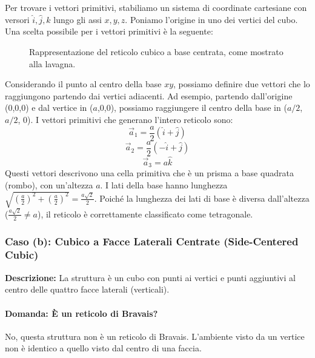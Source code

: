 Per trovare i vettori primitivi, stabiliamo un sistema di coordinate cartesiane con versori $\hat{i}, \hat{j}, \hat{k}$ lungo gli assi $x, y, z$. Poniamo l'origine in uno dei vertici del cubo. Una scelta possibile per i vettori primitivi è la seguente:

\begin{figure}[h!]
    \centering
    \caption{Rappresentazione del reticolo cubico a base centrata, come mostrato alla lavagna.}
\end{figure}

Considerando il punto al centro della base $xy$, possiamo definire due vettori che lo raggiungono partendo dai vertici adiacenti. Ad esempio, partendo dall'origine (0,0,0) e dal vertice in ($a$,0,0), possiamo raggiungere il centro della base in ($a/2$, $a/2$, 0). I vettori primitivi che generano l'intero reticolo sono:
$$ \vec{a}_1 = \frac{a}{2}(\hat{i} + \hat{j}) $$
$$ \vec{a}_2 = \frac{a}{2}(-\hat{i} + \hat{j}) $$
$$ \vec{a}_3 = a\hat{k} $$
Questi vettori descrivono una cella primitiva che è un prisma a base quadrata (rombo), con un'altezza $a$. I lati della base hanno lunghezza $\sqrt{(\frac{a}{2})^2 + (\frac{a}{2})^2} = \frac{a\sqrt{2}}{2}$. Poiché la lunghezza dei lati di base è diversa dall'altezza ($ \frac{a\sqrt{2}}{2} \neq a $), il reticolo è correttamente classificato come tetragonale.

\subsubsection{Caso (b): Cubico a Facce Laterali Centrate (Side-Centered Cubic)}
\textbf{Descrizione:} La struttura è un cubo con punti ai vertici e punti aggiuntivi al centro delle quattro facce laterali (verticali).

\paragraph{Domanda: È un reticolo di Bravais?}
No, questa struttura non è un reticolo di Bravais. L'ambiente visto da un vertice non è identico a quello visto dal centro di una faccia.

